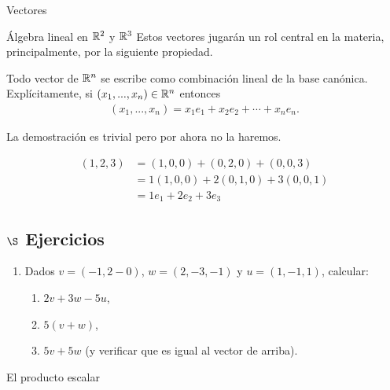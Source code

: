 \begin{chapter}{Vectores}
\begin{section}{\'Algebra lineal en $\mathbb R^2$ y $\mathbb R^3$}
Estos vectores jugarán un rol central en la materia, principalmente, por la siguiente propiedad.


\begin{proposicion}
    Todo vector de $\mathbb R^n$ se escribe como combinación lineal de la base canónica. Explícitamente, si $(x_1, ..., x_n)\in\mathbb R^n$ entonces
    \begin{align*}
    (x_1, ..., x_n)=x_1e_1+x_2e_2+\cdots+x_ne_n.
    \end{align*}
\end{proposicion}


La demostración es trivial pero por ahora no la haremos. 


\begin{ejemplo*}
    
    \begin{align*}
    (1,2,3)&=(1,0,0)+(0,2,0)+(0,0,3)\\
    &=1(1,0,0)+2(0,1,0)+3(0,0,1)\\
    &=1e_1+2e_2+3e_3
    \end{align*}
    
\end{ejemplo*}




\subsection*{$\S$ Ejercicios}   
\begin{enumerate}
    \item Dados $v = (-1, 2-0)$, $w = (2,-3,-1)$ y $u = (1,-1,1)$, calcular:
    \begin{enumerate}
        \item $2v + 3w -5u$,
        \item $5(v+w)$, 
        \item $5v + 5w$ (y verificar que es igual al vector de arriba).
    \end{enumerate}
\end{enumerate}




\end{section}
    
    
    
    \begin{section}{El producto escalar}\label{seccion-el-producto-escalar}
        

\end{section}
\end{chapter}
